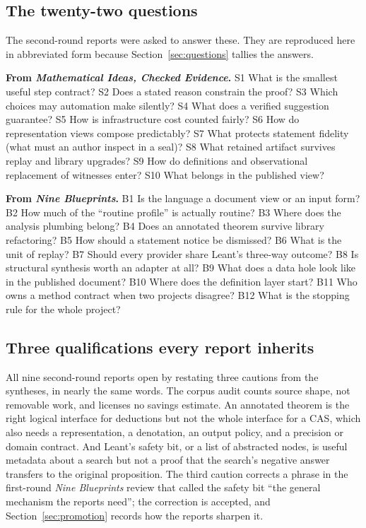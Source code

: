 \documentclass[11pt,a4paper]{article}
\theoremstyle{definition}
\begin{document}
\subsection{The twenty-two questions}\label{sec:22}
The second-round reports were asked to answer these. They are reproduced here in abbreviated form because Section~\ref{sec:questions} tallies the answers.

\begin{keybox}
\textbf{From \emph{Mathematical Ideas, Checked Evidence}.}
S1 What is the smallest useful step contract?
S2 Does a stated reason constrain the proof?
S3 Which choices may automation make silently?
S4 What does a verified suggestion guarantee?
S5 How is infrastructure cost counted fairly?
S6 How do representation views compose predictably?
S7 What protects statement fidelity (what must an author inspect in a seal)?
S8 What retained artifact survives replay and library upgrades?
S9 How do definitions and observational replacement of witnesses enter?
S10 What belongs in the published view?

\textbf{From \emph{Nine Blueprints}.}
B1 Is the language a document view or an input form?
B2 How much of the ``routine profile'' is actually routine?
B3 Where does the analysis plumbing belong?
B4 Does an annotated theorem survive library refactoring?
B5 How should a statement notice be dismissed?
B6 What is the unit of replay?
B7 Should every provider share Leant's three-way outcome?
B8 Is structural synthesis worth an adapter at all?
B9 What does a data hole look like in the published document?
B10 Where does the definition layer start?
B11 Who owns a method contract when two projects disagree?
B12 What is the stopping rule for the whole project?
\end{keybox}

\subsection{Three qualifications every report inherits}
All nine second-round reports open by restating three cautions from the syntheses, in nearly the same words. The corpus audit counts source shape, not removable work, and licenses no savings estimate. An annotated theorem is the right logical interface for deductions but not the whole interface for a CAS, which also needs a representation, a denotation, an output policy, and a precision or domain contract. And Leant's safety bit, or a list of abstracted nodes, is useful metadata about a search but not a proof that the search's negative answer transfers to the original proposition. The third caution corrects a phrase in the first-round \emph{Nine Blueprints} review that called the safety bit ``the general mechanism the reports need''; the correction is accepted, and Section~\ref{sec:promotion} records how the reports sharpen it.
\end{document}
